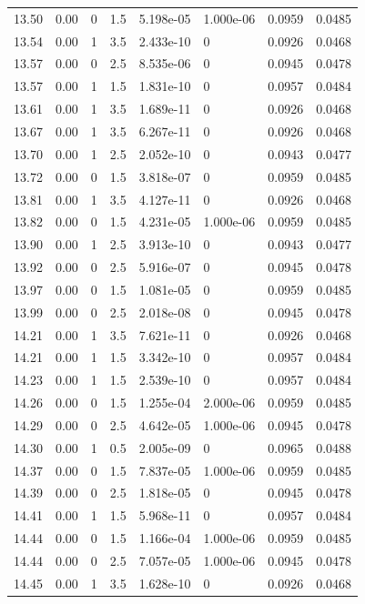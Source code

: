 \documentclass[preview]{standalone}
\begin{document}
{{{{{{\begin{tabular}{L{1.2cm}C{1.2cm} C{0.3cm}C{0.5cm} C{1.4cm}C{1.4cm} C{1.4cm}C{1.4cm}}
  13.50  &  0.00  & 0     & 1.5 &  5.198e-05  & 1.000e-06  & 0.0959 &  0.0485   \\ 
  13.54  &  0.00  & 1     & 3.5 &  2.433e-10  & 0  & 0.0926 &  0.0468   \\ 
  13.57  &  0.00  & 0     & 2.5 &  8.535e-06  & 0  & 0.0945 &  0.0478   \\ 
  13.57  &  0.00  & 1     & 1.5 &  1.831e-10  & 0  & 0.0957 &  0.0484   \\ 
  13.61  &  0.00  & 1     & 3.5 &  1.689e-11  & 0  & 0.0926 &  0.0468   \\ 
  13.67  &  0.00  & 1     & 3.5 &  6.267e-11  & 0  & 0.0926 &  0.0468   \\ 
  13.70  &  0.00  & 1     & 2.5 &  2.052e-10  & 0  & 0.0943 &  0.0477   \\ 
  13.72  &  0.00  & 0     & 1.5 &  3.818e-07  & 0  & 0.0959 &  0.0485   \\ 
  13.81  &  0.00  & 1     & 3.5 &  4.127e-11  & 0  & 0.0926 &  0.0468   \\ 
  13.82  &  0.00  & 0     & 1.5 &  4.231e-05  & 1.000e-06  & 0.0959 &  0.0485   \\ 
  13.90  &  0.00  & 1     & 2.5 &  3.913e-10  & 0  & 0.0943 &  0.0477   \\ 
  13.92  &  0.00  & 0     & 2.5 &  5.916e-07  & 0  & 0.0945 &  0.0478   \\ 
  13.97  &  0.00  & 0     & 1.5 &  1.081e-05  & 0  & 0.0959 &  0.0485   \\ 
  13.99  &  0.00  & 0     & 2.5 &  2.018e-08  & 0  & 0.0945 &  0.0478   \\ 
  14.21  &  0.00  & 1     & 3.5 &  7.621e-11  & 0  & 0.0926 &  0.0468   \\ 
  14.21  &  0.00  & 1     & 1.5 &  3.342e-10  & 0  & 0.0957 &  0.0484   \\ 
  14.23  &  0.00  & 1     & 1.5 &  2.539e-10  & 0  & 0.0957 &  0.0484   \\ 
  14.26  &  0.00  & 0     & 1.5 &  1.255e-04  & 2.000e-06  & 0.0959 &  0.0485   \\ 
  14.29  &  0.00  & 0     & 2.5 &  4.642e-05  & 1.000e-06  & 0.0945 &  0.0478   \\ 
  14.30  &  0.00  & 1     & 0.5 &  2.005e-09  & 0  & 0.0965 &  0.0488   \\ 
  14.37  &  0.00  & 0     & 1.5 &  7.837e-05  & 1.000e-06  & 0.0959 &  0.0485   \\ 
  14.39  &  0.00  & 0     & 2.5 &  1.818e-05  & 0  & 0.0945 &  0.0478   \\ 
  14.41  &  0.00  & 1     & 1.5 &  5.968e-11  & 0  & 0.0957 &  0.0484   \\ 
  14.44  &  0.00  & 0     & 1.5 &  1.166e-04  & 1.000e-06  & 0.0959 &  0.0485   \\ 
  14.44  &  0.00  & 0     & 2.5 &  7.057e-05  & 1.000e-06  & 0.0945 &  0.0478   \\ 
  14.45  &  0.00  & 1     & 3.5 &  1.628e-10  & 0  & 0.0926 &  0.0468   \\ 
\hline 
\end{tabular} 

}}}}}}
\end{document}
